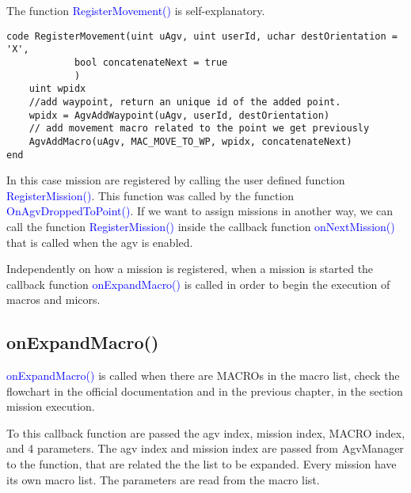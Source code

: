 The function \textcolor{blue}{RegisterMovement()} is self-explanatory.

\begin{lstlisting}[caption=RegisterMovement() function,label=lstRegisterMovment]
code RegisterMovement(uint uAgv, uint userId, uchar destOrientation = 'X',
			bool concatenateNext = true
			)
	uint wpidx
	//add waypoint, return an unique id of the added point.
	wpidx = AgvAddWaypoint(uAgv, userId, destOrientation)
	// add movement macro related to the point we get previously
	AgvAddMacro(uAgv, MAC_MOVE_TO_WP, wpidx, concatenateNext)
end
\end{lstlisting}

In this case mission are registered by calling the user defined function \textcolor{blue}{RegisterMission()}. This function was called by the function \textcolor{blue}{OnAgvDroppedToPoint()}. If we want to assign missions in another way, we can call the function \textcolor{blue}{RegisterMission()} inside the callback function \textcolor{blue}{onNextMission()} that is called when the agv is enabled.

Independently on how a mission is registered, when a mission is started the callback function \textcolor{blue}{onExpandMacro()} is called in order to begin the execution of macros and micors.

%
\subsection*{onExpandMacro()}

\textcolor{blue}{onExpandMacro()} is called when there are MACROs in the macro list, check the flowchart in the official documentation and in the previous chapter, in the section mission execution.

To this callback function are passed the agv index, mission index, MACRO index, and 4 parameters. The agv index and mission index are passed from AgvManager to the function, that are related the the list to be expanded. Every mission have its own macro list. The parameters are read from the macro list.

